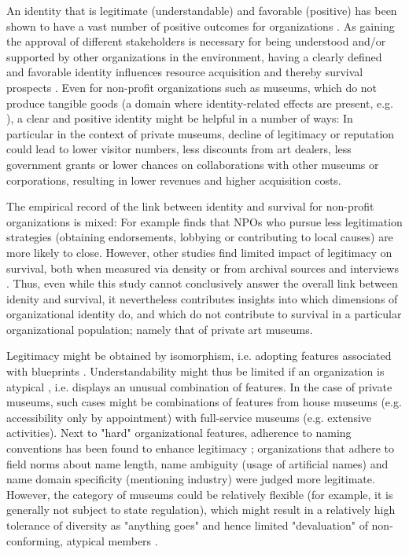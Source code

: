 \documentclass[12pt]{article}
\begin{document}
An identity that is legitimate (understandable) and favorable (positive) has been shown to have a vast number of positive outcomes for organizations \parencite{Lange_Lee_Dai_2010_reputation}.
As gaining the approval of different stakeholders is necessary for being understood and/or supported by other organizations in the environment, having a clearly defined and favorable identity influences resource acquisition and thereby survival prospects \parencite{Rao_1994_reputation}.
Even for non-profit organizations such as museums, which do not produce tangible goods (a domain where identity-related effects are present, e.g. \cite{Hsu_2015_granted,Bogaert_etal_2014_ecological}), a clear and positive identity might be helpful in a number of ways:
In particular in the context of private museums, decline of legitimacy or reputation could lead to lower visitor numbers, less discounts from art dealers, less government grants or lower chances on collaborations with other museums or corporations, resulting in lower revenues and higher acquisition costs.


The empirical record of the link between identity and survival for non-profit organizations is mixed: 
For example \textcite{Bielefeld_1994_survival} finds that NPOs who pursue less legitimation strategies (obtaining endorsements, lobbying or contributing to local causes) are more likely to close.
However, other studies find limited impact of legitimacy on survival, both when measured via density \parencite{Bogaert_etal_2014_ecological} or from archival sources and interviews \parencite{Fernandez_2007_dissolution}.
Thus, even while this study cannot conclusively answer the overall link between idenity and survival, it nevertheless contributes insights into which dimensions of organizational identity do, and which do not contribute to survival in a particular organizational population; namely that of private art museums.


Legitimacy might be obtained by isomorphism, i.e. adopting features associated with blueprints \parencite{diMaggio_1983_iron}.
Understandability \parencite{Glynn_Abzug_2002_names} might thus be limited if an organization is atypical \parencite{Rosch_1975_family}, i.e. displays an unusual combination of features.
In the case of private museums, such cases might be combinations of features from house museums (e.g. accessibility only by appointment) with full-service museums (e.g. extensive activities). 
Next to "hard" organizational features, adherence to naming conventions has been found to enhance legitimacy \parencite{Glynn_Abzug_2002_names}; organizations that adhere to field norms about name length, name ambiguity (usage of artificial names) and name domain specificity (mentioning industry) were judged more legitimate. 
However, the category of museums could be relatively flexible (for example, it is generally not subject to state regulation), which might result in a relatively high tolerance of diversity as "anything goes" and hence limited "devaluation" of non-conforming, atypical members \parencite{Bogaert_etal_2014_ecological}.
\end{document}
